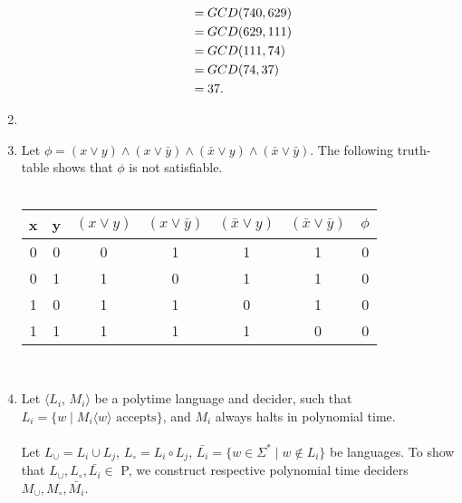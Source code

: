 \documentclass[11pt]{article}
\begin{document}
\begin{enumerate}[7.1]
\begin{enumerate}
\begin{align*}
      =\hspace{0.25em} & GCD(740, 629)   & \\
      =\hspace{0.25em} & GCD(629, 111)   & \\
      =\hspace{0.25em} & GCD(111, 74)    & \\
      =\hspace{0.25em} & GCD(74, 37)     & \\
      =\hspace{0.25em} & 37.
    \end{align*}
  \end{enumerate}
  \item
  \item Let $\phi = (x \lor y) \land (x \lor \bar{y}) \land (\bar{x} \lor y) \land (\bar{x} \lor \bar{y})$. The following truth-table shows that $\phi$ is not satisfiable. \\\\
    \begin{tabular}{|c|c|c|c|c|c|c|} \hline
      x & y & $(x \lor y)$ & $(x \lor \bar{y})$ & $(\bar{x} \lor y)$ & $(\bar{x} \lor \bar{y})$ & $\phi$ \\ \hline
      0 & 0 & 0            & 1                  & 1                  & 1                        & 0      \\ \hline
      0 & 1 & 1            & 0                  & 1                  & 1                        & 0      \\ \hline
      1 & 0 & 1            & 1                  & 0                  & 1                        & 0      \\ \hline
      1 & 1 & 1            & 1                  & 1                  & 0                        & 0      \\ \hline
    \end{tabular} \\
  \item Let $\langle L_i$, $M_i \rangle$ be a polytime language and decider, such that $L_i = \{ w \mid M_i\langle w \rangle \text{ accepts} \}$, and $M_i$ always halts in polynomial time. \\\\
    Let $L_\cup = L_i \cup L_j$, $L_\circ = L_i \circ L_j$, $\bar{L_i} = \{ w \in \Sigma^* \mid w \notin L_i \}$ be languages. To show that $L_\cup, L_\circ, \bar{L_i} \in$ P, we construct respective polynomial time deciders $M_\cup, M_\circ, \bar{M_i}$. \\\\

\end{enumerate}
\end{document}
